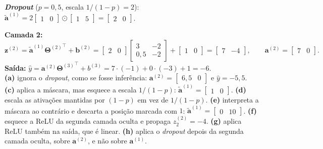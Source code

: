 \documentclass[11pt,a4paper]{article}
\begin{document}
\textbf{\textit{Dropout}} ($p = 0{,}5$, escala $1/(1-p) = 2$): $\widetilde{\mathbf{a}}^{(1)} = 2\begin{bmatrix} 1 & 0 \end{bmatrix} \odot \begin{bmatrix} 1 & 5 \end{bmatrix} = \begin{bmatrix} 2 & 0 \end{bmatrix}$.

\textbf{Camada 2:}
\[
\mathbf{z}^{(2)} = \widetilde{\mathbf{a}}^{(1)}{\mathbf{\Theta}^{(2)}}^{\top} + \mathbf{b}^{(2)}
= \begin{bmatrix} 2 & 0 \end{bmatrix}\begin{bmatrix} 3 & -2 \\ 0{,}5 & -2 \end{bmatrix} + \begin{bmatrix} 1 & 0 \end{bmatrix}
= \begin{bmatrix} 7 & -4 \end{bmatrix},
\qquad
\mathbf{a}^{(2)} = \begin{bmatrix} 7 & 0 \end{bmatrix}.
\]
\textbf{Saída:} $\hat{y} = \mathbf{a}^{(2)}{\mathbf{\Theta}^{(3)}}^{\top} + b^{(3)} = 7\cdot(-1) + 0\cdot(-3) + 1 = -6$.\\
\textbf{(a)} ignora o \textit{dropout}, como se fosse inferência: $\mathbf{a}^{(2)} = \begin{bmatrix} 6{,}5 & 0 \end{bmatrix}$ e $\hat{y} = -5{,}5$.
\textbf{(c)} aplica a máscara, mas esquece a escala $1/(1-p)$: $\widetilde{\mathbf{a}}^{(1)} = \begin{bmatrix} 1 & 0 \end{bmatrix}$.
\textbf{(d)} escala as ativações mantidas por $(1-p)$ em vez de $1/(1-p)$.
\textbf{(e)} interpreta a máscara ao contrário e descarta a posição marcada com $1$: $\widetilde{\mathbf{a}}^{(1)} = \begin{bmatrix} 0 & 10 \end{bmatrix}$.
\textbf{(f)} esquece a ReLU da segunda camada oculta e propaga $z^{(2)}_2 = -4$.
\textbf{(g)} aplica ReLU também na saída, que é linear.
\textbf{(h)} aplica o \textit{dropout} depois da segunda camada oculta, sobre $\mathbf{a}^{(2)}$, e não sobre $\mathbf{a}^{(1)}$.
\end{document}
